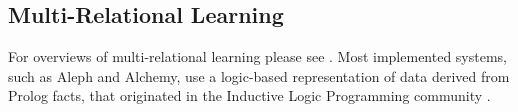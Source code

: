 \documentclass{IEEEtran}
\begin{document}

\subsection{Multi-Relational Learning} 
For overviews of multi-relational learning please see \cite{SRL2007,Domingos2009,Kimmig2015}. 
Most implemented systems, such as Aleph and Alchemy, use a logic-based representation of data derived from Prolog facts, that originated in the Inductive Logic Programming community \cite{Dzeroski2001c}. 
\end{document}
